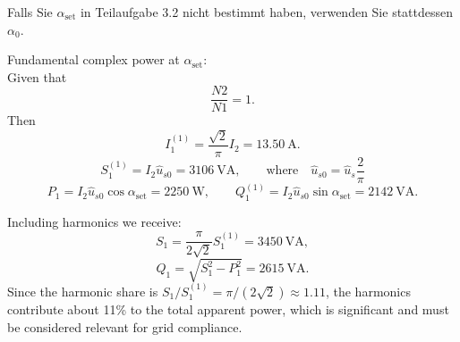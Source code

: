 \begin{germanhintblock}
    Falls Sie $\alpha_\mathrm{set}$ in Teilaufgabe 3.2 nicht bestimmt haben, verwenden Sie stattdessen $\alpha_0$.
\end{germanhintblock}
\begin{solutionblock}
    Fundamental complex power at $\alpha_{\mathrm{set}}$:\\
    Given that $$\frac{N2}{N1} = 1.$$
    Then
    $$I_1^{(1)}=\frac{\sqrt{2}}{\pi}I_2=\SI{13.50}{\ampere}.$$
    $$S_1^{(1)}=I_2\hat{u}_{s0}=\SI{3106}{\volt\ampere}, \qquad \text{where} \quad \hat{u}_{s0} = \hat{u}_{s}\frac{2}{\pi}$$
    $$P_1=I_2\hat{u}_{s0}\cos\alpha_{\mathrm{set}}=\SI{2250}{\watt},\qquad
        Q_1^{(1)}=I_2\hat{u}_{s0}\sin\alpha_{\mathrm{set}}=\SI{2142}{\volt\ampere}.$$
\end{solutionblock}
\begin{solutionblock}
    Including harmonics we receive:
    $$S_1=\frac{\pi}{2\sqrt{2}}S_1^{(1)}=\SI{3450}{\volt\ampere},$$
    $$Q_1=\sqrt{S_1^2-P_1^2}=\SI{2615}{\volt\ampere}.$$
    Since the harmonic share is $S_1/S_1^{(1)}=\pi/(2\sqrt{2})\approx 1.11$, the harmonics contribute about 11\% to the total apparent power, which is significant and must be considered relevant for grid compliance.
\end{solutionblock}